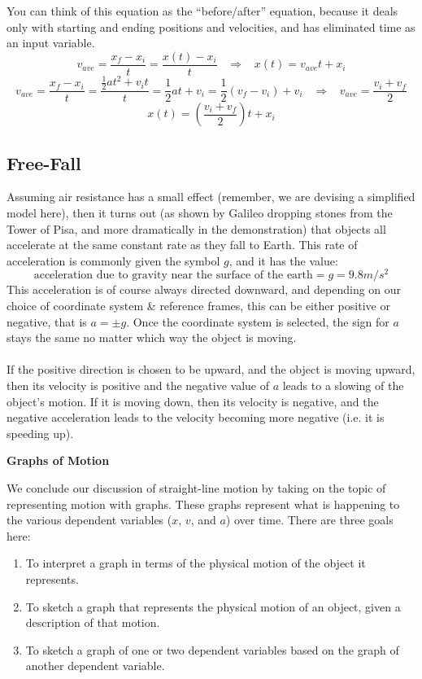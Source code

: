 \documentclass[12pt,addpoints]{exam}
\begin{document}
	You can think of this equation as the “before/after” equation, because it deals only with starting and ending positions and velocities, and has eliminated time as an input variable.
	$${v_{ave}} = \dfrac{x_f - x_i}{t} = \dfrac{x \left( t \right) - x_i}{t}\;\;\;\Rightarrow \;\;\; x \left( t \right) = v_{ave}t + x_i$$
	$${v_{ave}} = \dfrac{x_f - x_i}{t} = \dfrac{\frac{1}{2}a{t^2} + {v_i}t}{t} = \frac{1}{2}at + v_i = \frac{1}{2}\left( v_f - v_i \right) + v_i \;\;\; \Rightarrow \;\;\; v_{ave} = \dfrac{v_i + v_f}{2}$$
	$$x \left( t \right) = (\dfrac{v_i + v_f}{2})t + x_i$$
	\begin{center}
		\subsection*{Free-Fall}
	\end{center}
	Assuming air resistance has a small effect (remember, we are devising a simplified model here), then it turns out (as shown by Galileo dropping stones from the Tower of Pisa, and more dramatically in the demonstration) that objects all accelerate at the same constant rate as they fall to Earth. This rate of acceleration is commonly given the symbol $g$, and it has the value:
	$$\text{acceleration due to gravity near the surface of the earth}=g=9.8m/s^2$$
	This acceleration is of course always directed downward, and depending on our choice of coordinate system \& reference frames, this can be either positive or negative, that is $a=\pm g$. Once the coordinate system is selected, the sign for $a$ stays the same no matter which way the object is moving. \\ \\
	If the positive direction is chosen to be upward, and the object is moving upward, then its velocity is positive and the negative value of $a$
	leads to a slowing of the object’s motion. If it is moving down, then its velocity is negative, and the negative acceleration leads to the velocity becoming more negative (i.e. it is speeding up).
	\begin{center}
		\textbf{Graphs of Motion}
	\end{center}
    We conclude our discussion of straight-line motion by taking on the topic of representing motion with graphs. These graphs represent what is happening to the various dependent variables ($x$, $v$, and $a$) over time. There are three goals here:
    \begin{enumerate}
    	\item To interpret a graph in terms of the physical motion of the object it represents.
    	\item To sketch a graph that represents the physical motion of an object, given a description of that motion.
    	\item To sketch a graph of one or two dependent variables based on the graph of another dependent variable.
    \end{enumerate}
\end{document}
